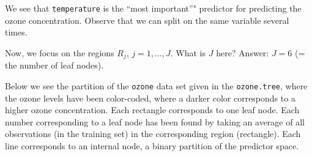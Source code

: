 \documentclass[ignorenonframetext,]{beamer}
\begin{document}
\begin{frame}[fragile]

We see that \texttt{temperature} is the ``most important''" predictor
for predicting the ozone concentration. Observe that we can split on the
same variable several times.

\end{frame}

\begin{frame}[fragile]

Now, we focus on the regions \(R_j\), \(j=1,\ldots, J\). What is \(J\)
here? Answer: \(J=6\) (= the number of leaf nodes).

Below we see the partition of the \texttt{ozone} data set given in the
\texttt{ozone.tree}, where the ozone levels have been color-coded, where
a darker color corresponds to a higher ozone concentration. Each
rectangle corresponds to one leaf node. Each number corresponding to a
leaf node has been found by taking an average of all observations (in
the training set) in the corresponding region (rectangle). Each line
corresponds to an internal node, a binary partition of the predictor
space.

\end{frame}
\end{document}
